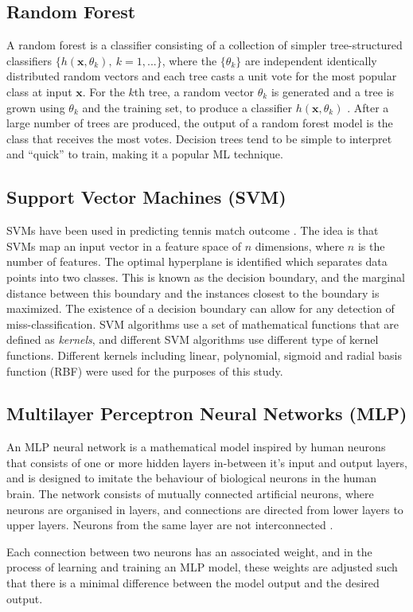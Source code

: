\subsection{Random Forest}
A random forest is a classifier consisting of a collection of simpler tree-structured classifiers $\{h(\textbf{x},\theta_k),\ k=1,...\}$, where the $\{\theta_k\}$ are independent identically distributed random vectors and each tree casts a unit vote for the most popular class at input $\textbf{x}$. For the $k$th tree, a random vector $\theta_k$ is generated and a tree is grown using $\theta_k$ and the training set, to produce a classifier $h(\textbf{x}, \theta_k)$ \cite{breiman2001random}. After a large number of trees are produced, the output of a random forest model is the class that receives the most votes. Decision trees tend to be simple to interpret and ``quick'' to train, making it a popular ML technique.

\subsection{Support Vector Machines (SVM)}
SVMs have been used in predicting tennis match outcome \cite{cornman2017machine}. The idea is that SVMs map an input vector in a feature space of $n$ dimensions, where $n$ is the number of features. The optimal hyperplane is identified which separates data points into two classes. This is known as the decision boundary, and the marginal distance between this boundary and the instances closest to the boundary is maximized. The existence of a decision boundary can allow for any detection of miss-classification. SVM algorithms use a set of mathematical functions that are defined as \textit{kernels}, and different SVM algorithms use different type of kernel functions. Different kernels including linear, polynomial, sigmoid and radial basis function (RBF) were used for the purposes of this study.

\subsection{Multilayer Perceptron Neural Networks (MLP)}
An MLP neural network is a mathematical model inspired by human neurons that consists of one or more hidden layers in-between it's input and output layers, and is designed to imitate the behaviour of biological neurons in the human brain. The network consists of mutually connected artificial neurons, where neurons are organised in layers, and connections are directed from lower layers to upper layers. Neurons from the same layer are not interconnected \cite{noriega2005multilayer}.

Each connection between two neurons has an associated weight, and in the process of learning and training an MLP model, these weights are adjusted such that there is a minimal difference between the model output and the desired output. 
